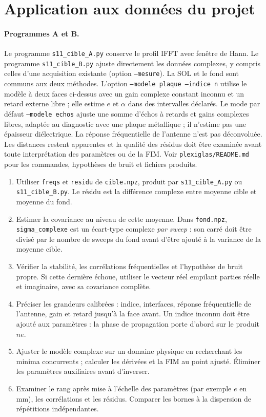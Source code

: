 \documentclass[11pt,a4paper]{article}
\begin{document}
\section{Application aux données du projet}

\paragraph{Programmes A et B.}
Le programme \texttt{s11\_cible\_A.py} conserve le profil IFFT avec fenêtre
de Hann. Le programme \texttt{s11\_cible\_B.py} ajuste directement les données
complexes, y compris celles d'une acquisition existante (option
\texttt{--mesure}). La SOL et le fond sont communs aux deux méthodes.
L'option \texttt{--modele plaque --indice n} utilise le modèle à deux faces
ci-dessus avec un gain complexe constant inconnu et un retard externe libre ;
elle estime $e$ et $\alpha$ dans des intervalles déclarés.
Le mode par défaut \texttt{--modele echos} ajuste une somme d'échos à retards
et gains complexes libres, adaptée au diagnostic avec une plaque métallique ;
il n'estime pas une épaisseur diélectrique.
La réponse fréquentielle de l'antenne n'est pas déconvoluée. Les distances
restent apparentes et la qualité des résidus doit être examinée avant toute
interprétation des paramètres ou de la FIM. Voir \texttt{plexiglas/README.md}
pour les commandes, hypothèses de bruit et fichiers produits.


\begin{enumerate}
\item Utiliser \texttt{freqs} et \texttt{residu} de \texttt{cible.npz},
produit par \texttt{s11\_cible\_A.py} ou \texttt{s11\_cible\_B.py}. Le résidu est la différence complexe
entre moyenne cible et moyenne du fond.
\item Estimer la covariance au niveau de cette moyenne. Dans
\texttt{fond.npz}, \texttt{sigma\_complexe} est un écart-type complexe
\emph{par sweep} : son carré doit être divisé par le nombre de sweeps du
fond avant d'être ajouté à la variance de la moyenne cible.
\item Vérifier la stabilité, les corrélations fréquentielles et l'hypothèse
de bruit propre. Si cette dernière échoue, utiliser le vecteur réel empilant
parties réelle et imaginaire, avec sa covariance complète.
\item Préciser les grandeurs calibrées : indice, interfaces, réponse
fréquentielle de l'antenne, gain et retard jusqu'à la face avant.
Un indice inconnu doit être ajouté aux paramètres : la phase de propagation
porte d'abord sur le produit $ne$.
\item Ajuster le modèle complexe sur un domaine physique en recherchant
les minima concurrents ; calculer les dérivées et la FIM au point ajusté.
Éliminer les paramètres auxiliaires avant d'inverser.
\item Examiner le rang après mise à l'échelle des paramètres (par exemple
$e$ en mm), les corrélations et les résidus. Comparer les bornes à la
dispersion de répétitions indépendantes.
\end{enumerate}
\end{document}
